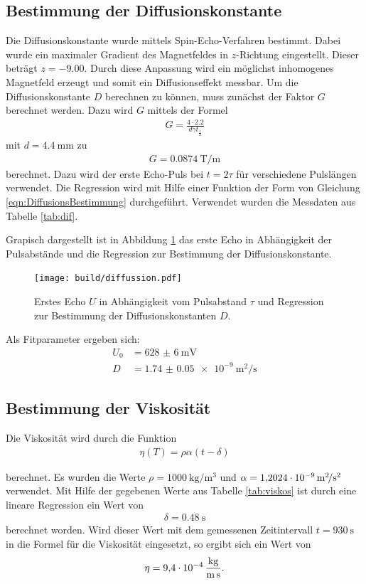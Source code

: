 \subsection{Bestimmung der Diffusionskonstante}
Die Diffusionskonstante wurde mittels Spin-Echo-Verfahren bestimmt. Dabei wurde
ein maximaler Gradient des Magnetfeldes in $z$-Richtung eingestellt. Dieser beträgt
$z = -\num{9.00}$. Durch diese Anpassung wird ein möglichst inhomogenes Magnetfeld
erzeugt und somit ein Diffusionseffekt messbar.
Um die Diffusionskonstante $D$ berechnen zu können, muss zunächst der Faktor
$G$ berechnet werden. Dazu wird $G$ mittels der Formel
\begin{align*}
  G = \frac{4\cdot 2.2}{d \gamma t_\frac{1}{2}}
\end{align*}
mit $d = \SI{4.4}{\milli\meter}$ zu
\begin{align*}
  G = \SI{0.0874}{\tesla\per\meter}
\end{align*}
berechnet.
Dazu wird der erste Echo-Puls bei $t = 2\tau$ für verschiedene Pulslängen
verwendet. Die Regression wird mit Hilfe
einer Funktion der Form von Gleichung \eqref{eqn:DiffusionsBestimmung} durchgeführt. Verwendet wurden die
Messdaten aus Tabelle \ref{tab:dif}.

Grapisch dargestellt ist in Abbildung
\ref{plt:diff} das erste Echo in Abhängigkeit der Pulsabstände und die Regression
zur Bestimmung der Diffusionskonstante.
\begin{figure}[htb]
  \centering
  \texttt{[image: build/diffussion.pdf]}
  \caption{Erstes Echo $U$ in Abhängigkeit vom Pulsabstand $\tau$ und Regression
  zur Bestimmung der Diffusionskonstanten $D$.}
  \label{plt:diff}
\end{figure}
Als Fitparameter ergeben sich:
\begin{align*}
  U_0 &= \SI{628(6)}{\milli\volt} \\
  D &= \SI{1.74(5)e-9}{\square\meter\per\second}
\end{align*}

\subsection{Bestimmung der Viskosität}
Die Viskosität wird durch die Funktion
\begin{align*}
  \eta(T) = \rho \alpha \left(t - \delta\right)
\end{align*}

berechnet. Es wurden die Werte $\rho = \SI{1000}{\kilo\gram\per\cubic\meter}$
und $\alpha = \SI{1.2024d-9}{\square\meter\per\square\second}$ verwendet. Mit
Hilfe der gegebenen Werte aus Tabelle \ref{tab:viskos} ist durch eine lineare
Regression ein Wert von
\begin{align*}
  \delta = \SI{0.48}{\second}
\end{align*}
berechnet worden. Wird dieser Wert mit dem gemessenen Zeitintervall
$t = \SI{930}{\second}$ in die Formel für die Viskosität eingesetzt,
so ergibt sich ein Wert von
\begin{align*}
  \eta = \SI{9.4d-4}{\kilo\gram\per\meter\per\second}.
\end{align*}


